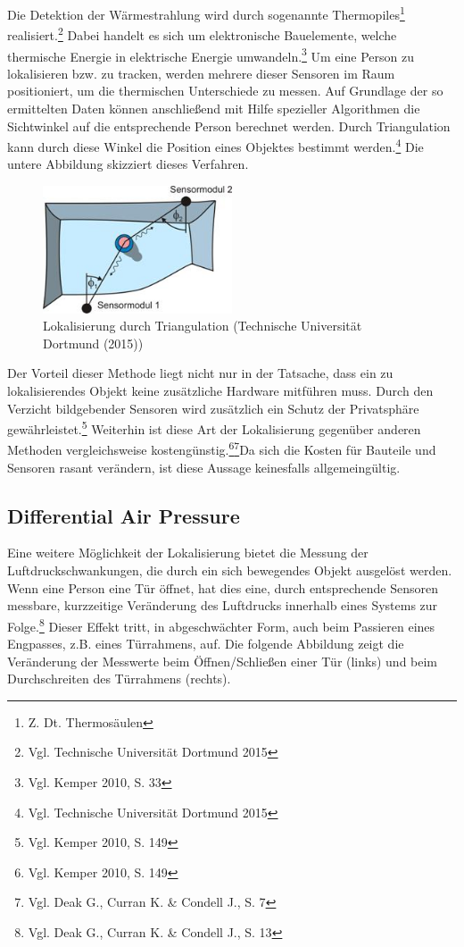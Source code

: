 Die Detektion der Wärmestrahlung wird durch sogenannte Thermopiles\footnote{Z. Dt. Thermosäulen}  realisiert.\footnote{Vgl. Technische Universität Dortmund 2015} Dabei handelt es sich um elektronische Bauelemente, welche thermische Energie in elektrische Energie umwandeln.\footnote{Vgl. Kemper 2010, S. 33} Um eine Person zu lokalisieren bzw. zu tracken, werden mehrere dieser Sensoren im Raum positioniert, um die thermischen Unterschiede zu messen. Auf Grundlage der so ermittelten Daten können anschließend mit Hilfe spezieller Algorithmen die Sichtwinkel auf die entsprechende Person berechnet werden. Durch Triangulation kann durch diese Winkel die Position eines Objektes bestimmt werden.\footnote{Vgl. Technische Universität Dortmund 2015} Die untere Abbildung skizziert dieses Verfahren.

\begin{figure}[H]
	\centering
	\includegraphics[width=0.5\textwidth]{pictures/triangulation}
	\caption{Lokalisierung durch Triangulation (Technische Universität Dortmund (2015))}
\end{figure}

Der Vorteil dieser Methode liegt nicht nur in der Tatsache, dass ein zu lokalisierendes Objekt keine zusätzliche Hardware mitführen muss. Durch den Verzicht bildgebender Sensoren wird zusätzlich ein Schutz der Privatsphäre gewährleistet.\footnote{Vgl. Kemper 2010, S. 149} Weiterhin ist diese Art der Lokalisierung gegenüber anderen Methoden vergleichsweise kostengünstig.\footnote{Vgl. Kemper 2010, S. 149}\footnote{Vgl. Deak G., Curran K. \& Condell J., S. 7}Da sich die Kosten für Bauteile und Sensoren rasant verändern, ist diese Aussage keinesfalls allgemeingültig. 

\subsection{Differential Air Pressure}
Eine weitere Möglichkeit der Lokalisierung bietet die Messung der Luftdruckschwankungen, die durch ein sich bewegendes Objekt ausgelöst werden. Wenn eine Person eine Tür öffnet, hat dies eine, durch entsprechende Sensoren messbare, kurzzeitige Veränderung des Luftdrucks innerhalb eines Systems zur Folge.\footnote{Vgl. Deak G., Curran K. \& Condell J., S. 13} Dieser Effekt tritt, in abgeschwächter Form, auch beim Passieren eines Engpasses, z.B. eines Türrahmens, auf. Die folgende Abbildung zeigt die Veränderung der Messwerte beim Öffnen/Schließen einer Tür (links) und beim Durchschreiten des Türrahmens (rechts).

